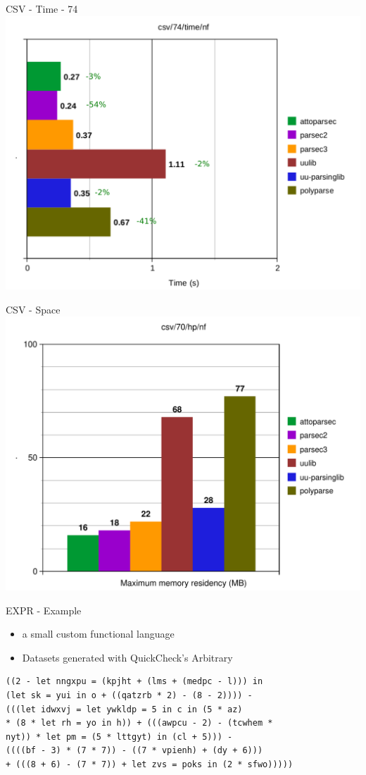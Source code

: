\documentclass{beamer}
\begin{document}
\begin{frame}{CSV - Time - 74}
\includegraphics[scale=0.5]{presentation/csv-74-time-nf_.pdf}
\end{frame}

\begin{frame}{CSV - Space}
\includegraphics[scale=0.5]{presentation/csv-70-hp-nf.pdf}
\end{frame}

\begin{frame}[fragile]{EXPR - Example}
\begin{itemize}
\item a small custom functional language
\item Datasets generated with QuickCheck's Arbitrary
\end{itemize}
\begin{verbatim}
((2 - let nngxpu = (kpjht + (lms + (medpc - l))) in 
(let sk = yui in o + ((qatzrb * 2) - (8 - 2)))) - 
(((let idwxvj = let ywkldp = 5 in c in (5 * az) 
* (8 * let rh = yo in h)) + (((awpcu - 2) - (tcwhem * 
nyt)) * let pm = (5 * lttgyt) in (cl + 5))) - 
((((bf - 3) * (7 * 7)) - ((7 * vpienh) + (dy + 6))) 
+ (((8 + 6) - (7 * 7)) + let zvs = poks in (2 * sfwo)))))
\end{verbatim}
\end{frame}
\end{document}
